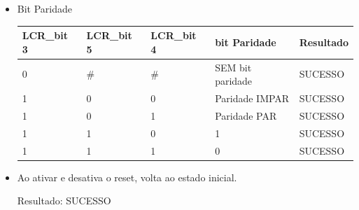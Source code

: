 \documentclass[12pt, a4paper]{article}
\begin{document}
\begin{itemize}
		\item Bit Paridade
		\begin{table}[H]
			\begin{center}
				\begin{tabular}{|l|l|l|l|l|}
					\hline
					LCR\_bit 3 & LCR\_bit 5 & LCR\_bit 4 & bit Paridade     & Resultado \\ \hline
					0          & \#         & \#         & SEM bit paridade & SUCESSO  \\ \hline
					1          & 0          & 0          & Paridade IMPAR   & SUCESSO   \\ \hline
					1          & 0          & 1          & Paridade PAR     & SUCESSO   \\ \hline
					1          & 1          & 0          & 1                & SUCESSO   \\ \hline
					1          & 1          & 1          & 0                & SUCESSO   \\ \hline
				\end{tabular}
			\end{center}
		\end{table}
		
		
		\item Ao ativar e desativa o reset, volta ao estado inicial. 
		\par Resultado: SUCESSO
		
	\end{itemize}
	
	
\end{document}
